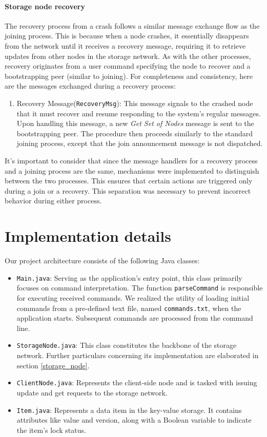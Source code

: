 \documentclass[a4paper, 11pt]{article}
\begin{document}
\paragraph{Storage node recovery} The recovery process from a crash follows a similar message exchange flow as the joining process. This is because when a node crashes, it essentially disappears from the network until it receives a recovery message, requiring it to retrieve updates from other nodes in the storage network. As with the other processes, recovery originates from a user command specifying the node to recover and a bootstrapping peer (similar to joining). For completeness and consistency, here are the messages exchanged during a recovery process:

\begin{enumerate}
    \item Recovery Message(\verb|RecoveryMsg|): This message signals to the crashed node that it must recover and resume responding to the system's regular messages. Upon handling this message, a new \textit{Get Set of Nodes} message is sent to the bootstrapping peer. The procedure then proceeds similarly to the standard joining process, except that the join announcement message is not dispatched.
\end{enumerate}

It's important to consider that since the message handlers for a recovery process and a joining process are the same, mechanisms were implemented to distinguish between the two processes. This ensures that certain actions are triggered only during a join or a recovery. This separation was necessary to prevent incorrect behavior during either process.

\section{Implementation details}


Our project architecture consists of the following Java classes:
\begin{itemize}
    \item \verb|Main.java|: Serving as the application's entry point, this class primarily focuses on command interpretation. The function \verb|parseCommand| is responsible for executing received commands. We realized the utility of loading initial commands from a pre-defined text file, named \verb|commands.txt|, when the application starts. Subsequent commands are processed from the command line.
    \item \verb|StorageNode.java|: This class constitutes the backbone of the storage network. Further particulars concerning its implementation are elaborated in section \ref{storage_node}.
    \item \verb|ClientNode.java|: Represents the client-side node and is tasked with issuing update and get requests to the storage network.
    \item \verb|Item.java|: Represents a data item in the key-value storage. It contains attributes like value and version, along with a Boolean variable to indicate the item's lock status.
\end{itemize}
\end{document}
